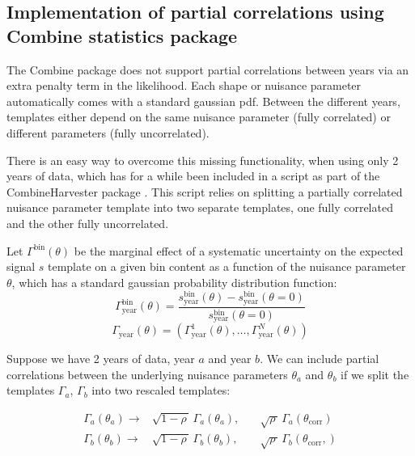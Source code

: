 \subsection{Implementation of partial correlations using Combine statistics package}
\label{SS:combine}

The Combine package does not support partial correlations between years via an extra penalty term in the likelihood. Each shape or nuisance parameter automatically comes with a standard gaussian pdf. Between the different years, templates either depend on the same nuisance parameter (fully correlated) or different parameters (fully uncorrelated).

There is an easy way to overcome this missing functionality, when using only 2 years of data, which has for a while been included in a script as part of the CombineHarvester package \cite{CHscript}. This script relies on splitting a partially correlated nuisance parameter template into two separate templates, one fully correlated and the other fully uncorrelated. 

Let $\Gamma^{\mathrm{bin}}(\theta)$ be the marginal effect of a systematic uncertainty on the expected signal $s$ template on a given bin content as a function of the nuisance parameter $\theta$, which has a standard gaussian probability distribution function:
\begin{equation}
    \Gamma^{\mathrm{bin}}_\mathrm{year}(\theta) = \frac{s^\mathrm{bin}_\mathrm{year}(\theta)-s^\mathrm{bin}_\mathrm{year}(\theta = 0)}{s^\mathrm{bin}_\mathrm{year}(\theta = 0)} 
\end{equation}
\begin{equation}
    \Gamma _\mathrm{year}(\theta) = (\Gamma^1_\mathrm{year} (\theta), \ldots, \Gamma^N_\mathrm{year} (\theta))
\end{equation}

Suppose we have 2 years of data, year $a$ and year $b$. We can include partial correlations between the underlying nuisance parameters $\theta_a$ and $\theta_b$ if we split the templates $\Gamma_a$, $\Gamma_b$ into two rescaled templates:

	\begin{eqnarray}
	\Gamma_{a}(\theta_{a})\longrightarrow& \sqrt{1-\rho\,}\,\Gamma_{a}(\theta_{a}),\quad&\sqrt{\rho\,}\,\Gamma_a(\theta_\mathrm{corr}) \\
		\Gamma_{b}(\theta_{b})\longrightarrow& \sqrt{1-\rho\,}\,\Gamma_{b}(\theta_{b}),\quad&\sqrt{\rho\,}\,\Gamma_b(\theta_\mathrm{corr},)
	\end{eqnarray}

